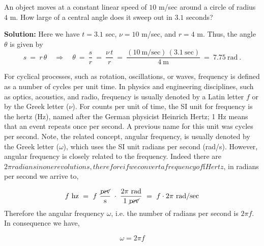 \begin{exmp}
 An object moves at a constant linear speed of $10$ m/sec around a circle of radius $4$ m. How large
 of a central angle does it sweep out in $3.1$ seconds?\vspace{1mm}
 \par\noindent\textbf{Solution:} Here we have $t=3.1$ sec, $\nu=10$ m/sec, and $r=4$ m. Thus, the
 angle $\theta$ is given by
 \begin{displaymath}
  s ~=~ r\,\theta \quad\Rightarrow\quad \theta ~=~ \frac{s}{r} ~=~ \frac{\nu\,t}{r} ~=~
   \frac{(10~\text{m/sec})\,(3.1~\text{sec})}{4~\text{m}} ~=~ \boxed{7.75~\text{rad}} ~.
 \end{displaymath}
\end{exmp}
\divider
\vspace{1mm}


For cyclical processes, such as rotation, oscillations, or waves, frequency is defined as a number of cycles per unit time. In physics and engineering disciplines, such as optics, acoustics, and radio, frequency is usually denoted by a Latin letter $f$ or by the Greek letter  ($\nu$).  For counts per unit of time, the SI unit for frequency is the hertz (Hz), named after the German physicist Heinrich Hertz; 1 Hz means that an event repeats once per second. A previous name for this unit was cycles per second.
Note, the related concept, angular frequency, is usually denoted by the Greek letter ($\omega$), which uses the SI unit radians per second (rad/s). However, angular frequency is closely related to the frequency. Indeed there are $2\pi radians in one revolutions, therefore if we convert a frequency of $f$ Hertz$, in radians per second we arrive to,

\begin{displaymath}
 f~\text{hz} ~=~ f~\frac{\cancel{\text{rev}}}{\text{s}} \;\cdot\;
  \frac{2\pi~\text{rad}}{1~\cancel{\text{rev}}} ~=~ f \cdot 2\pi~\text{rad/sec}
\end{displaymath}
Therefore the angular frequency $\omega$, i.e. the number of radians per second is $2\pi f$. In consequence we have,

\begin{displaymath}
\omega = 2 \pi f 
\end{displaymath}

